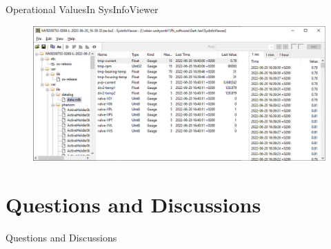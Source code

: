 \documentclass[t, 9pt, aspectratio=169]{beamer}
\begin{document}
    \begin{frame}{Operational Values}{In SysInfoViewer}
        \vspace*{-0.8cm}
        \begin{figure}
            \hspace*{-0.7cm}\includegraphics[scale=0.5]{rrdb-in-sysinfoviewer.jpg}
        \end{figure}
    \end{frame}

    \section{Questions and Discussions}

    \begin{frame}{Questions and Discussions}
    \end{frame}
\end{document}
